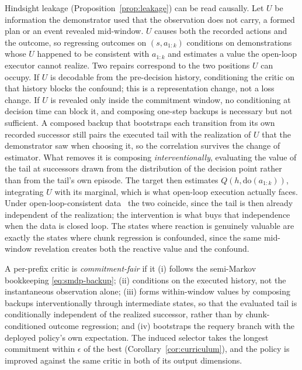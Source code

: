 \begin{remark}
\label{rem:confound}
Hindsight leakage (Proposition~\ref{prop:leakage}) can be read causally. Let $U$ be information
the demonstrator used that the observation does not carry, a formed plan or an event revealed
mid-window. $U$ causes both the recorded actions and the outcome, so regressing outcomes on
$(s,a_{1:k})$ conditions on demonstrations whose $U$ happened to be consistent with $a_{1:k}$ and
estimates a value the open-loop executor cannot realize. Two repairs correspond to the two
positions $U$ can occupy. If $U$ is decodable from the pre-decision history, conditioning the
critic on that history blocks the confound; this is a representation change, not a loss change.
If $U$ is revealed only inside the commitment window, no conditioning at decision time can block
it, and composing one-step backups is necessary but not sufficient. A composed backup that
bootstraps each transition from its own recorded successor still pairs the executed tail with the
realization of $U$ that the demonstrator saw when choosing it, so the correlation survives the
change of estimator. What removes it is composing \emph{interventionally}, evaluating the value of
the tail at successors drawn from the distribution of the decision point rather than from the
tail's own episode. The target then estimates $Q(h, \mathrm{do}(a_{1:k}))$, integrating $U$ with its
marginal, which is what open-loop execution actually faces. Under open-loop-consistent
data~\citep{dqc} the two coincide, since the tail is then already independent of the realization;
the intervention is what buys that independence when the data is closed loop. The states where
reaction is genuinely valuable are exactly the states where chunk regression is confounded, since
the same mid-window revelation creates both the reactive value and the confound.
\end{remark}

\begin{definition}
\label{def:cfac}
A per-prefix critic is \emph{commitment-fair} if it
(i) follows the semi-Markov bookkeeping \eqref{eq:smdp-backup};
(ii) conditions on the executed history, not the instantaneous observation alone;
(iii) forms within-window values by composing backups interventionally through intermediate
states, so that the evaluated tail is conditionally independent of the realized successor, rather
than by chunk-conditioned outcome regression; and
(iv) bootstraps the requery branch with the deployed policy's own expectation.
The induced selector takes the longest commitment within $\epsilon$ of the best
(Corollary~\ref{cor:curriculum}), and the policy is improved against the same critic in both of
its output dimensions.
\end{definition}

